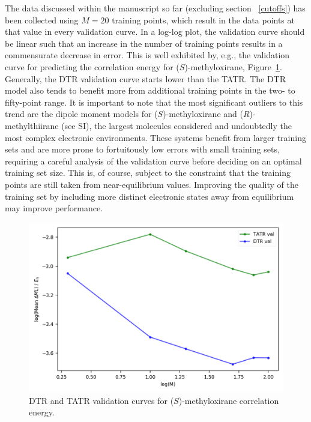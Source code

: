The data discussed within the manuscript so far (excluding section ~\ref{cutoffs}) has been collected using $M = 20$ training points, which result in the data points at that value in every validation curve.
In a log-log plot, the validation curve should be linear such that an increase in the number of training points results in a commensurate decrease in error. 
This is well exhibited by, e.g., the validation curve for predicting the correlation energy for ($\textit{S}$)-methyloxirane, Figure~\ref{fig:metox_E_learn}. 
Generally, the DTR validation curve starts lower than the TATR. The DTR model also tends to benefit more from additional training points in the two- to fifty-point range. 
It is important to note that the most significant outliers to this trend are the dipole moment models for ($\textit{S}$)-methyloxirane and ($\textit{R}$)-methylthiirane (see SI), the largest molecules considered and undoubtedly the most complex electronic environments. These systems benefit from larger training sets and are more prone to fortuitously low errors with small training sets, requiring a careful analysis of the validation curve before deciding on an optimal training set size.
This is, of course, subject to the constraint that the training points are still taken from near-equilibrium values. Improving the quality of the training set by including more distinct electronic states away from equilibrium may improve performance.

\begin{figure}
    \centering
    \includegraphics[scale=1]{p2/figures/metox_log_learn.png}
    \caption{DTR and TATR validation curves for ($\textit{S}$)-methyloxirane correlation energy.}
    \label{fig:metox_E_learn}
\end{figure}

